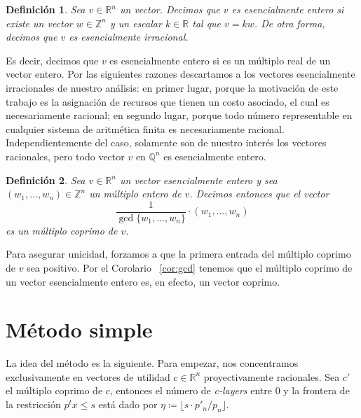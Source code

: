 \documentclass[11pt]{article}
\newtheorem{definition}{Definición}
\begin{document}
\begin{definition}
	Sea $v \in \mathbb{R}^n$ un vector. Decimos que $v$ es esencialmente entero si existe un vector
	$w \in \mathbb{Z}^n$ y un escalar $k \in \mathbb{R}$ tal que $v = kw$. De otra forma, decimos
	que $v$ es esencialmente irracional.
\end{definition}

Es decir, decimos que $v$ es esencialmente entero si es un múltiplo real de un vector entero. Por
las siguientes razones descartamos a los vectores esencialmente irracionales de nuestro análisis: en
primer lugar, porque la motivación de este trabajo es la asignación de recursos que tienen un costo
asociado, el cual es necesariamente racional; en segundo lugar, porque todo número representable en
cualquier sistema de aritmética finita es necesariamente racional. Independientemente del caso,
solamente son de nuestro interés los vectores racionales, pero todo vector $v$ en $\mathbb{Q}^n$ es
esencialmente entero.

\begin{definition}
	Sea $v \in \mathbb{R}^n$ un vector esencialmente entero y sea $(w_1, \ldots, w_n) \in
	\mathbb{Z}^n$ un múltiplo entero de $v$. Decimos entonces que el vector
	\begin{equation*}
		\frac{1}{\gcd\lbrace w_1, \ldots, w_n\rbrace} \cdot (w_1, \ldots, w_n)
	\end{equation*}
	es un múltiplo coprimo de $v$.
\end{definition}

Para asegurar unicidad, forzamos a que la primera entrada del múltiplo coprimo de $v$ sea positivo.
Por el Corolario ~\ref{cor:gcd} tenemos que el múltiplo coprimo de un vector esencialmente entero
es, en efecto, un vector coprimo.

\section*{Método simple}

La idea del método es la siguiente. Para empezar, nos concentramos exclusivamente en vectores de
utilidad $c \in \mathbb{R}^n$ proyectivamente racionales. Sea $c'$ el múltiplo coprimo de $c$,
entonces el número de \textit{c-layers} entre 0 y la frontera de la restricción $p^tx \leq s$ está
dado por $\eta \coloneq \lfloor s \cdot p'_n / p_n \rfloor$.
\end{document}
